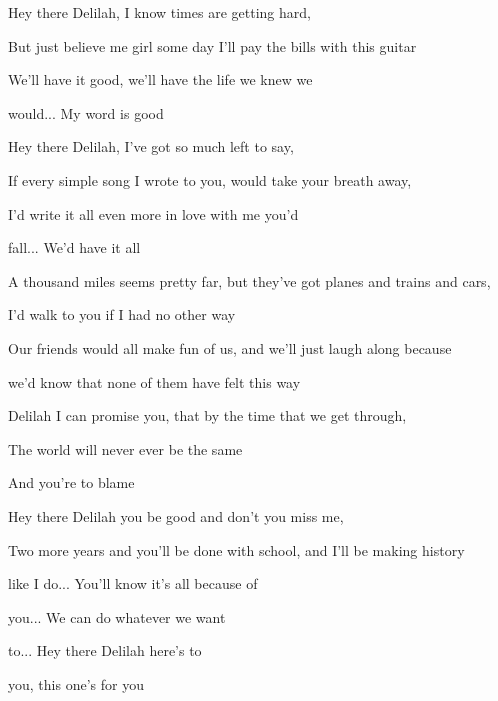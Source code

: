 \begin{song}
\bigskip

 Hey there Delilah, I know times are getting hard, \par
But just believe me girl some day I'll pay the bills with this guitar \par
We'll have it good,  we'll have the life we knew we \par
{}would... My word is good \par

\bigskip

 Hey there Delilah, I've got so much left to say, \par
If every simple song I wrote to you, would take your breath away, \par
I'd write it all even more in love with me you'd \par
{}fall... We'd have it all \par

\bigskip


\bigskip

A thousand miles seems pretty far, but they've got planes and trains and cars, \par
I'd walk to you if I had no other way \par
Our friends would all make fun of us, and we'll just laugh along because  \par
we'd know that none of them have felt this way \par
Delilah I can promise you, that by the time that we get through, \par
The world will never ever be the same \par
And you're to blame  \par

\bigskip

 Hey there Delilah you be good and don't you miss me, \par
Two more years and you'll be done with school, and I'll be making history \par
like I do...  You'll know it's all because of \par
{}you... We can do whatever we want \par
{}to...  Hey there Delilah here's to \par
{}you, this one’s for you \par

\bigskip


\end{song}
